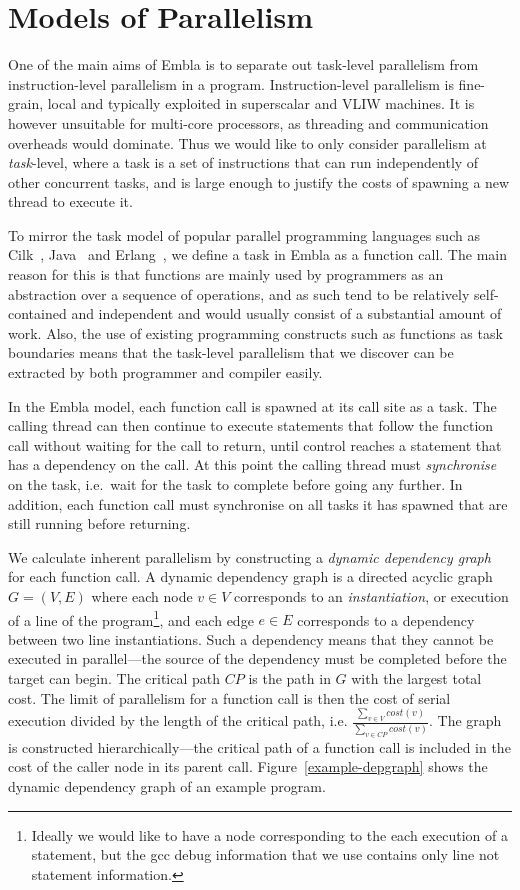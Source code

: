 \section{Models of Parallelism}

One of the main aims of Embla is to separate out task-level parallelism from instruction-level parallelism in a program.
Instruction-level parallelism is fine-grain, local and typically exploited in superscalar and VLIW machines.
It is however unsuitable for multi-core processors, as threading and communication overheads would dominate.
Thus we would like to only consider parallelism at \emph{task}-level, where a task is a set of instructions that can run independently of other concurrent tasks, and is large enough to justify the costs of spawning a new thread to execute it.

To mirror the task model of popular parallel programming languages such as Cilk~\cite{blumofe96cilk}, Java~\cite{lea00java} and Erlang~\cite{armstrong07programming}, we define a task in Embla as a function call.
The main reason for this is that functions are mainly used by programmers as an abstraction over a sequence of operations, and as such tend to be relatively self-contained and independent and would usually consist of a substantial amount of work.
Also, the use of existing programming constructs such as functions as task boundaries means that the task-level parallelism that we discover can be extracted by both programmer and compiler easily.

In the Embla model, each function call is spawned at its call site as a task.
The calling thread can then continue to execute statements that follow the function call without waiting for the call to return, until control reaches a statement that has a dependency on the call.
At this point the calling thread must \emph{synchronise} on the task, i.e.\ wait for the task to complete before going any further.
In addition, each function call must synchronise on all tasks it has spawned that are still running before returning.

We calculate inherent parallelism by constructing a \emph{dynamic dependency graph} for each function call.
A dynamic dependency graph is a directed acyclic graph $G=(V,E)$ where each node $v\in V$ corresponds to an \emph{instantiation}, or execution of a line of the program\footnote{Ideally we would like to have a node corresponding to the each execution of a statement, but the gcc debug information that we use contains only line not statement information.}, and each edge $e\in E$ corresponds to a dependency between two line instantiations.
Such a dependency means that they cannot be executed in parallel---the source of the dependency must be completed before the target can begin.
The critical path $\mathit{CP}$ is the path in $G$ with the largest total cost.
The limit of parallelism for a function call is then the cost of serial execution divided by the length of the critical path, i.e. $\frac{\sum_{v\in V} cost(v)}{\sum_{v\in \mathit{CP}} cost(v)}$.
The graph is constructed hierarchically---the critical path of a function call is included in the cost of the caller node in its parent call.
Figure~\ref{example-depgraph} shows the dynamic dependency graph of an example program.

